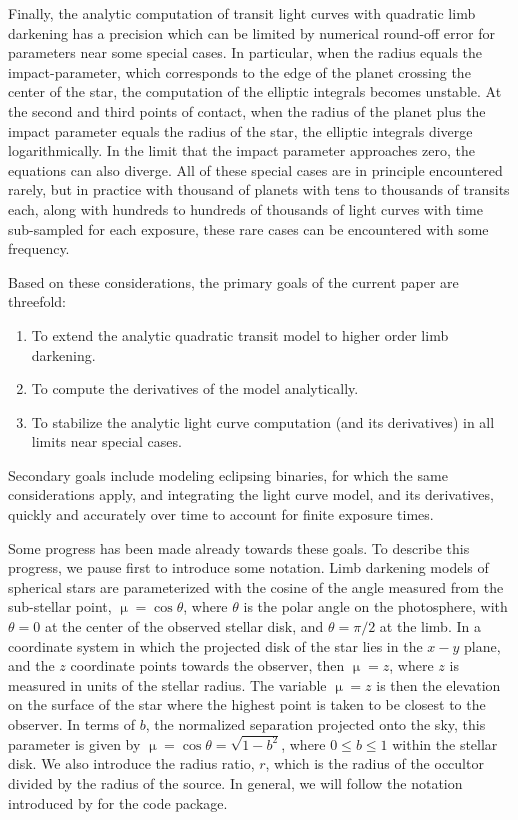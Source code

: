 \documentclass[modern]{aastex61}
\begin{document}
Finally, the analytic computation of transit light curves with quadratic
limb darkening has a precision which can be limited by numerical round-off 
error for parameters near some special cases.  In
particular, when the radius equals the impact-parameter, which corresponds to
the edge of the planet crossing the center of the star, the computation of the
elliptic integrals becomes unstable.  At the second and third points of
contact, when the radius of the planet plus the impact parameter equals
the radius of the star, the elliptic integrals diverge logarithmically.  In the
limit that the impact parameter approaches zero, the equations can also
diverge.  All of these special cases are in principle encountered rarely,
but in practice with thousand of planets with tens to thousands of
transits each, along with hundreds to hundreds of thousands of light
curves with time sub-sampled for each exposure, these rare cases can
be encountered with some frequency.

Based on these considerations, the primary goals of the current paper are
threefold:
\begin{enumerate}
\item To extend the analytic quadratic transit model to higher order limb darkening.
\item To compute the derivatives of the model analytically.
\item To stabilize the analytic light curve computation (and its derivatives)
in all limits near special cases.
\end{enumerate}
Secondary goals include modeling eclipsing binaries, for which the same
considerations apply, and integrating the light curve model, and its
derivatives, quickly and accurately over time to account for finite
exposure times.

Some progress has been made already towards these goals.  To describe this
progress, we pause first to introduce some notation.  Limb darkening models 
of spherical stars are parameterized with the cosine of the angle measured 
from the sub-stellar point, $\upmu = \cos{\theta}$, where $\theta$ is the 
polar angle on the photosphere, with $\theta=0$ at the center of the observed 
stellar disk, and $\theta=\pi/2$ at the limb.  In a coordinate system in which 
the projected disk of the star lies in the $x-y$ plane, and the $z$ coordinate 
points towards the observer, then $\upmu = z$, where $z$ is measured in units 
of the stellar radius.  The variable $\upmu=z$ is then the elevation on the
surface of the star where the highest point is taken to be closest to the observer.
In terms of $b$, the normalized separation projected onto 
the sky, this parameter is given by $\upmu = \cos{\theta} =\sqrt{1-b^2}$, where
$0\le b \le 1$ within the stellar disk.  We also introduce the radius ratio,
$r$, which is the radius of the occultor divided by the radius of the source.
In general, we will follow the notation
introduced by \citet{starry} for the \starry code package.
\end{document}
